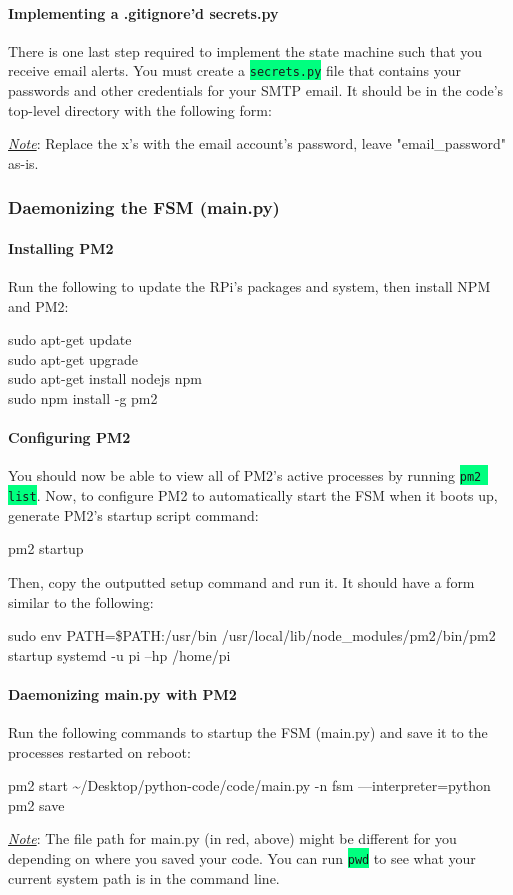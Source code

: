 \documentclass{article}
\newcommand*{\myfont}{\fontfamily{pcr}\selectfont}
\newcommand{\codei}[1]{\colorbox{SpringGreen}{\texttt{#1}}} %
\newcommand{\codeb}[2]{
  \begin{tcolorbox}[width=\textwidth,colback={SpringGreen},title={#1},colbacktitle=darkgreen,coltitle=SpringGreen]
    \myfont
    #2
  \end{tcolorbox}
} %
\newcommand{\outputb}[2]{
  \begin{tcolorbox}[width=\textwidth,colback={light-gray},title={#1},colbacktitle=gray,coltitle=light-gray]
    \myfont
    #2
  \end{tcolorbox}
} %
\newcommand{\red}[1]{\textcolor{BrickRed}{#1}} %
\newcommand{\note}[1]{\underline{\textit{Note}}: #1}
\begin{document}
    \paragraph{Implementing a .gitignore'd secrets.py}
    There is one last step required to implement the state machine such that you receive email alerts. You must create a \codei{secrets.py} file that contains your passwords and other credentials for your SMTP email. It should be in the code's top-level directory with the following form:
    
    \note{Replace the x's with the email account's password, leave "email\_password" as-is.}


  \subsubsection{Daemonizing the FSM (main.py)}
    \paragraph{Installing PM2}
    Run the following to update the RPi's packages and system, then install NPM and PM2:
    \codeb{Update RPi and install NPM and PM2}{
        sudo apt-get update \\
        sudo apt-get upgrade \\
        sudo apt-get install nodejs npm \\
        sudo npm install -g pm2 \\
    }
    \paragraph{Configuring PM2}
    You should now be able to view all of PM2's active processes by running \codei{pm2 list}. Now, to configure PM2 to automatically start the FSM when it boots up, generate PM2's startup script command:
    \codeb{Generate PM2's startup script command}{pm2 startup}
    Then, copy the outputted setup command and run it. It should have a form similar to the following:
    \outputb{Generate PM2's startup script (this is output, DO NOT EXECUTE IT)}{sudo env PATH=\$PATH:/usr/bin /usr/local/lib/node\_modules/pm2/bin/pm2 startup systemd -u pi --hp /home/pi}
    \paragraph{Daemonizing main.py with PM2}
    Run the following commands to startup the FSM (main.py) and save it to the processes restarted on reboot:
    \codeb{Start FSM process; save it to reboot processes}{
        pm2 start \red{\textasciitilde/Desktop/python-code/code/main.py} -n fsm ---interpreter=python \\
        pm2 save
    }
    \noindent
    \note{The file path for main.py (in red, above) might be different for you depending on where you saved your code. You can run \codei{pwd} to see what your current system path is in the command line.}
\end{document}
